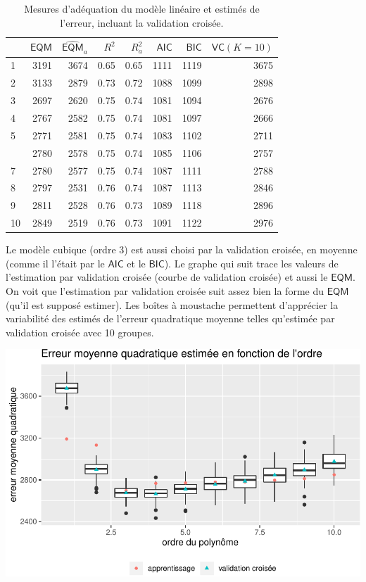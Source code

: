 \documentclass[
  11pt,
  letterpaper,
]{book}
\theoremstyle{definition}
\theoremstyle{definition}
\theoremstyle{definition}
\theoremstyle{definition}
\theoremstyle{remark}
\begin{document}
\begin{table}

\caption{\label{tab:02-table2}Mesures d'adéquation du modèle linéaire et estimés de l'erreur, incluant la validation croisée.}
\centering
\begin{tabular}[t]{lrrrrrrr}
\toprule
  & \(\mathsf{EQM}\) & \(\widehat{\mathsf{EQM}}_a\) & \(R^2\) & \(R^2_a\) & \(\mathsf{AIC}\) & \(\mathsf{BIC}\) & \(\mathsf{VC} (K=10)\)\\
\midrule
1 & 3191 & 3674 & 0.65 & 0.65 & 1111 & 1119 & 3675\\
2 & 3133 & 2879 & 0.73 & 0.72 & 1088 & 1099 & 2898\\
3 & 2697 & 2620 & 0.75 & 0.74 & 1081 & 1094 & 2676\\
4 & 2767 & 2582 & 0.75 & 0.74 & 1081 & 1097 & 2666\\
5 & 2771 & 2581 & 0.75 & 0.74 & 1083 & 1102 & 2711\\
\addlinespace
6 & 2780 & 2578 & 0.75 & 0.74 & 1085 & 1106 & 2757\\
7 & 2780 & 2577 & 0.75 & 0.74 & 1087 & 1111 & 2788\\
8 & 2797 & 2531 & 0.76 & 0.74 & 1087 & 1113 & 2846\\
9 & 2811 & 2528 & 0.76 & 0.73 & 1089 & 1118 & 2896\\
10 & 2849 & 2519 & 0.76 & 0.73 & 1091 & 1122 & 2976\\
\bottomrule
\end{tabular}
\end{table}

Le modèle cubique (ordre 3) est aussi choisi par la validation croisée, en moyenne (comme il l'était par le \(\mathsf{AIC}\) et le \(\mathsf{BIC}\)). Le graphe qui suit trace les valeurs de l'estimation par validation croisée (courbe de validation croisée) et aussi le \(\mathsf{EQM}\). On voit que l'estimation par validation croisée suit assez bien la forme du \(\mathsf{EQM}\) (qu'il est supposé estimer). Les boîtes à moustache permettent d'apprécier la variabilité des estimés de l'erreur quadratique moyenne telles qu'estimée par validation croisée avec 10 groupes.

\begin{center}\includegraphics[width=0.7\linewidth]{MATH60602_files/figure-latex/plotcv-1} \end{center}
\end{document}
